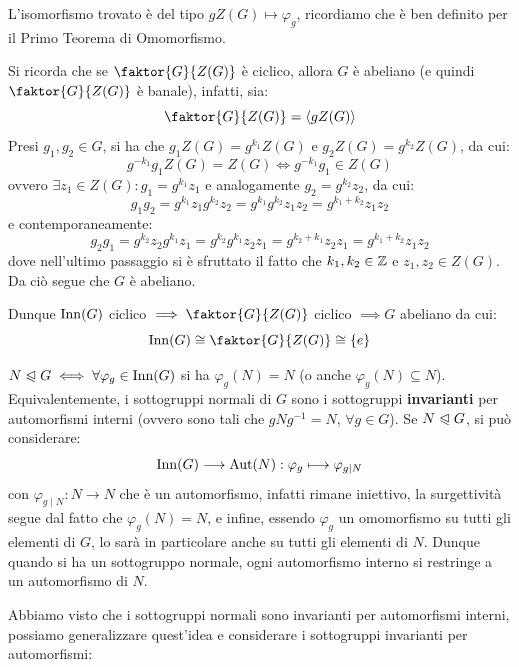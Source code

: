 \documentclass[11pt]{scrartcl}
\begin{document}
\begin{remark}
    L'isomorfismo trovato è del tipo $gZ(G) \longmapsto \varphi_g$, ricordiamo che è ben definito per il Primo Teorema di Omomorfismo.
\end{remark}

\begin{remark}
    Si ricorda che se $\faktor{G}{Z(G)}$ è ciclico, allora $G$ è abeliano (e quindi $\faktor{G}{Z(G)}$ è banale), infatti, sia:
        \[ \faktor{G}{Z(G)} = \left<gZ(G)\right>
            \]
    Presi $g_1,g_2 \in G$, si ha che $g_1Z(G) = g^{k_1}Z(G)$ e $g_2Z(G) = g^{k_2}Z(G)$, da cui:
        \[ g^{-k_1}g_1Z(G) = Z(G) \iff  g^{-k_1}g_1 \in Z(G)
            \]
    ovvero $\exists z_1 \in Z(G): g_1 = g^{k_1}z_1$ e analogamente $g_2 = g^{k_2}z_2$, da cui:
        \[ g_1g_2 = g^{k_1}z_1g^{k_2}z_2 = g^{k_1}g^{k_2}z_1z_2 = g^{k_1+k_2}z_1z_2
            \]
    e contemporaneamente:
        \[ g_2g_1 = g^{k_2}z_2g^{k_1}z_1 = g^{k_2}g^{k_1}z_2z_1 = g^{k_2 + k_1}z_2z_1 = g^{k_1+k_2}z_1z_2
            \]
    dove nell'ultimo passaggio si è sfruttato il fatto che $k_1,k_2 \in \mathbb Z$ e $z_1,z_2 \in Z(G)$. Da ciò segue che $G$ è abeliano.
\end{remark}

\begin{remark}
    Dunque $\operatorname{Inn}(G)$ ciclico $\implies \faktor{G}{Z(G)}$ ciclico $\implies G$ abeliano da cui:  
        \[ \Inn(G) \cong \faktor{G}{Z(G)} \cong \{e\}
            \]
\end{remark}

\begin{remark}
    $N \trianglelefteqslant G \iff \forall \varphi_g \in \operatorname{Inn}(G)$ si ha $\varphi_g(N) = N$ (o anche $\varphi_g(N) \subseteq N$). Equivalentemente, i sottogruppi
    normali di $G$ sono i sottogruppi \textbf{invarianti} per automorfismi interni (ovvero sono tali che $gNg^{-1} = N$, $\forall g \in G$). Se $N \trianglelefteqslant G$, si può considerare:
        \[ \operatorname{Inn}(G) \longrightarrow \operatorname{Aut}(N) : \varphi_g \longmapsto \varphi_{g \mid N}
            \]
    con $\varphi_{g \mid N} : N \longrightarrow N$ che è un automorfismo, infatti rimane iniettivo, la surgettività segue dal fatto che $\varphi_g(N) = N$, e infine, essendo $\varphi_g$ 
    un omomorfismo su tutti gli elementi di $G$, lo sarà in particolare anche su tutti gli elementi di $N$. Dunque quando si ha un sottogruppo normale, ogni automorfismo interno si restringe
    a un automorfismo di $N$.
\end{remark}

Abbiamo visto che i sottogruppi normali sono invarianti per automorfismi interni, possiamo generalizzare quest'idea e considerare i sottogruppi invarianti per automorfismi:
\end{document}
